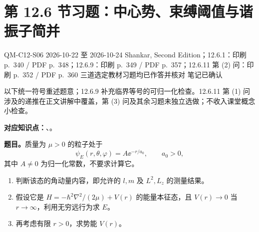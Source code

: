\section{第 12.6 节习题：中心势、束缚阈值与谐振子简并}
\label{exercises:QM-C12-S06}
\exercisemeta
  {QM-C12-S06}
  {2026-10-22 至 2026-10-24}
  {Shankar, Second Edition；12.6.1：印刷 p.~340 / PDF p.~348；12.6.9：印刷 p.~349 / PDF p.~357；12.6.11 第 (2) 问：印刷 p.~352 / PDF p.~360}
  {三道选定教材习题均已作答并核对}
  {笔记已确认}

以下统一符号重述题意；12.6.9 补充临界等号的可归一化检查。12.6.11 第 (1) 问涉及的递推在正文讲解中覆盖，第 (3) 问及其余习题未独立选做；不收入课堂概念小检查。

\textbf{对应知识点：}、。

\textbf{题目。}质量为 $\mu>0$ 的粒子处于
\begin{equation}
  \psi_E(r,\theta,\varphi)=A\ee^{-r/a_0},\qquad a_0>0,
\end{equation}
其中 $A\ne0$ 为归一化常数，不要求计算它。
\begin{enumerate}
  \item 判断该态的角动量内容，即允许的 $l,m$ 及 $L^2,L_z$ 的测量结果。
  \item 假设它是 $H=-\hbar^2\nabla^2/(2\mu)+V(r)$ 的能量本征态，且 $V(r)\to0$ 当 $r\to\infty$，利用无穷远行为求 $E$。
  \item 再考虑有限 $r>0$，求势能 $V(r)$。
\end{enumerate}

